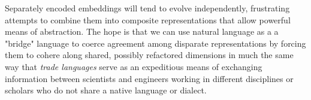 Separately encoded embeddings will tend to evolve independently, frustrating attempts to combine them into composite representations that allow powerful means of abstraction. The hope is that we can use natural language as a {} \emdash{} a "bridge" language \emdash{} to coerce agreement among disparate representations by forcing them to cohere along shared, possibly refactored dimensions in much the same way that {\it{trade languages}} serve as an expeditious means of exchanging information between scientists and engineers working in different disciplines or scholars who do not share a native language or dialect.\\


